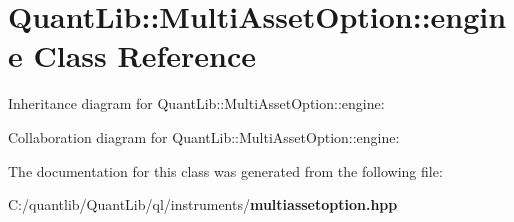 \section{Quant\+Lib\+:\+:Multi\+Asset\+Option\+:\+:engine Class Reference}
\label{class_quant_lib_1_1_multi_asset_option_1_1engine}


Inheritance diagram for Quant\+Lib\+:\+:Multi\+Asset\+Option\+:\+:engine\+:


Collaboration diagram for Quant\+Lib\+:\+:Multi\+Asset\+Option\+:\+:engine\+:


The documentation for this class was generated from the following file\+:\begin{DoxyCompactItemize}
\item 
C\+:/quantlib/\+Quant\+Lib/ql/instruments/{\bf multiassetoption.\+hpp}\end{DoxyCompactItemize}
